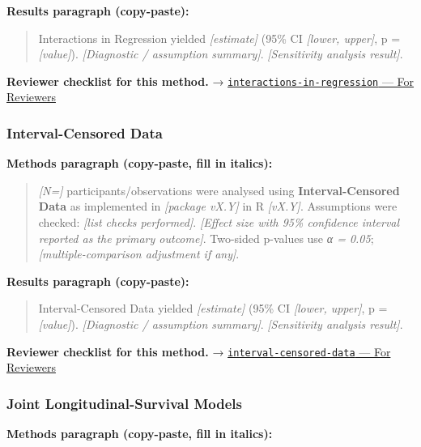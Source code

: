 \documentclass[
]{article}
\begin{document}
\textbf{Results paragraph (copy-paste):}

\begin{quote}
Interactions in Regression yielded \emph{{[}estimate{]}} (95\% CI
\emph{{[}lower, upper{]}}, p = \emph{{[}value{]}}). \emph{{[}Diagnostic
/ assumption summary{]}}. \emph{{[}Sensitivity analysis result{]}}.
\end{quote}

\textbf{Reviewer checklist for this method.} →
\href{../chapters/07-regression/interactions-in-regression.Rmd\#for-reviewers}{\texttt{interactions-in-regression}
--- For Reviewers}

\subsubsection{Interval-Censored Data}\label{interval-censored-data}

\textbf{Methods paragraph (copy-paste, fill in italics):}

\begin{quote}
\emph{{[}N={]}} participants/observations were analysed using
\textbf{Interval-Censored Data} as implemented in \emph{{[}package
vX.Y{]}} in R \emph{{[}vX.Y{]}}. Assumptions were checked: \emph{{[}list
checks performed{]}}. \emph{{[}Effect size with 95\% confidence interval
reported as the primary outcome{]}}. Two-sided p-values use \emph{α =
0.05}; \emph{{[}multiple-comparison adjustment if any{]}}.
\end{quote}

\textbf{Results paragraph (copy-paste):}

\begin{quote}
Interval-Censored Data yielded \emph{{[}estimate{]}} (95\% CI
\emph{{[}lower, upper{]}}, p = \emph{{[}value{]}}). \emph{{[}Diagnostic
/ assumption summary{]}}. \emph{{[}Sensitivity analysis result{]}}.
\end{quote}

\textbf{Reviewer checklist for this method.} →
\href{../chapters/11-survival/interval-censored-data.Rmd\#for-reviewers}{\texttt{interval-censored-data}
--- For Reviewers}

\subsubsection{Joint Longitudinal-Survival
Models}\label{joint-longitudinal-survival-models}

\textbf{Methods paragraph (copy-paste, fill in italics):}
\end{document}
